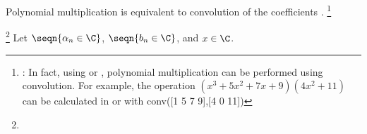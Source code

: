 Polynomial multiplication is equivalent to 
convolution  of the coefficients .
\footnote{
  : In fact, using \texttrademark\hspace{1ex} or \texttrademark,
  polynomial multiplication can be performed using convolution.
  For example, the operation 
  $(x^3 + 5x^2 + 7x + 9)(4x^2 + 11)$ can be calculated in 
  \texttrademark\hspace{1ex} or \texttrademark\hspace{1ex} with 
  conv([1 5 7 9],[4 0 11])
  }
\begin{theorem}
\label{thm:polymult}
\footnote{}
Let $\seqn{\alpha_n\in\C}$, $\seqn{b_n\in\C}$, and $x\in\C$.
\end{theorem}
